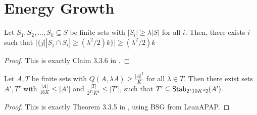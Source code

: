 \chapter{Energy Growth}
\label{chap:egrowth}

\begin{theorem}
    \label{claim336}
    \leanok

    Let $S_1, S_2, \dots, S_k \subseteq S$ be finite sets with $|S_i| \geq \lambda |S|$ for all $i$.
    Then, there exists $i$ such that $|\{j | |S_j \cap S_i| \geq (\lambda^2 / 2) k\}| \geq (\lambda^2 / 2) k$
\end{theorem}

\begin{proof}
    \leanok
    This is exactly Claim 3.3.6 in \cite{}.
\end{proof}

\begin{theorem}
    \label{Theorem335}
    \leanok

    Let $A, T$ be finite sets with $Q(A, \lambda A) \geq \frac{|A|^3}K$ for all $\lambda \in T$.
    Then there exist sets $A', T'$ with $\frac{|A|}{16 K} \leq |A'|$ and
        $\frac{|T|}{2^{17} K^4} \leq |T'|$, such that $T' \subseteq \operatorname{\operatorname{Stab}}_{2^110 K^42}(A')$.
\end{theorem}

\begin{proof}
    \leanok
    This is exactly Theorem 3.3.5 in \cite{}, using BSG from LeanAPAP.
\end{proof}